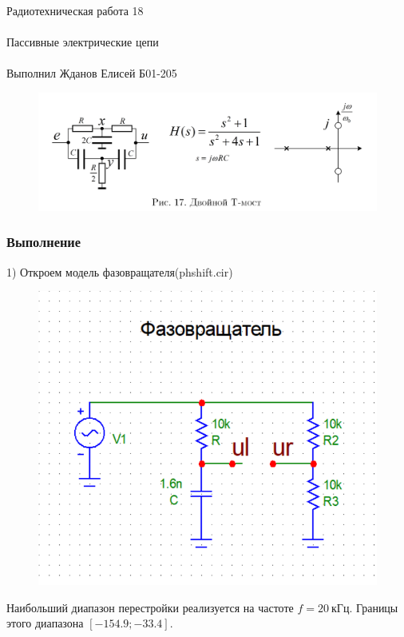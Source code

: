 \documentclass{astroedu-lab}
\begin{document}
\begin{problem}{\huge Радиотехническая работа 18\\\\Пассивные электрические цепи\\\\Выполнил Жданов Елисей Б01-205}
\begin{figure}[!h]
	\centering
	\includegraphics[width=1\textwidth]{3_4.png}
	\label{fig:boiler}
\end{figure}

\subsubsection{Выполнение}

1) Откроем модель фазовращателя(phshift.cir)

\begin{figure}[!h]
	\centering
	\includegraphics[width=1\textwidth]{3_1.png}
	\label{fig:boiler}
\end{figure}

Наибольший диапазон перестройки реализуется на частоте $f = 20  \: \textit{кГц}$. Границы этого диапазона $[-154.9; -33.4]$.


\end{problem}
\end{document}
